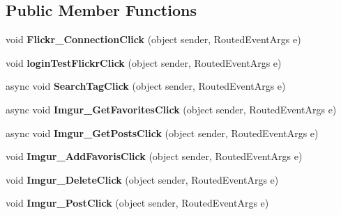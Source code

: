 \subsection*{Public Member Functions}
\begin{DoxyCompactItemize}
\item 
\mbox{\label{classepicture_1_1_main_page_af580ad7f9e7a6bfa7ae0340bf1a9aa76}} 
void {\bfseries Flickr\+\_\+\+Connection\+Click} (object sender, Routed\+Event\+Args e)
\item 
\mbox{\label{classepicture_1_1_main_page_a34f588b307d9dea1e5b3046b3472e724}} 
void {\bfseries login\+Test\+Flickr\+Click} (object sender, Routed\+Event\+Args e)
\item 
\mbox{\label{classepicture_1_1_main_page_a592bad2d0242a5c3bdf0da0cd5f05228}} 
async void {\bfseries Search\+Tag\+Click} (object sender, Routed\+Event\+Args e)
\item 
\mbox{\label{classepicture_1_1_main_page_a24d39b00621dfb70fbbc35088f405f4d}} 
async void {\bfseries Imgur\+\_\+\+Get\+Favorites\+Click} (object sender, Routed\+Event\+Args e)
\item 
\mbox{\label{classepicture_1_1_main_page_a52713a040797f1570484213c2d292846}} 
async void {\bfseries Imgur\+\_\+\+Get\+Posts\+Click} (object sender, Routed\+Event\+Args e)
\item 
\mbox{\label{classepicture_1_1_main_page_a392e46fadfee49659df5cb66a51d3146}} 
void {\bfseries Imgur\+\_\+\+Add\+Favoris\+Click} (object sender, Routed\+Event\+Args e)
\item 
\mbox{\label{classepicture_1_1_main_page_aba8153d4a3931c63bff8b9106c4b1924}} 
void {\bfseries Imgur\+\_\+\+Delete\+Click} (object sender, Routed\+Event\+Args e)
\item 
\mbox{\label{classepicture_1_1_main_page_a40dea502bf70bacc5831aa9979bdb0f3}} 
void {\bfseries Imgur\+\_\+\+Post\+Click} (object sender, Routed\+Event\+Args e)
\item 

\end{DoxyCompactItemize}
